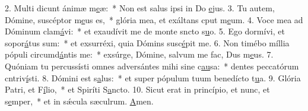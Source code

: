2. Multi dicunt ánimæ m\uline{e}æ:~* Non est salus ipsi in Do \uline{e}jus.
3. Tu autem, Dómine, suscéptor m\uline{e}us es,~* glória mea, et exáltans cput m\uline{e}um.
4. Voce mea ad Dóminum clam\uline{á}vi:~* et exaudívit me de monte sncto s\uline{u}o.
5. Ego dormívi, et sopor\uline{á}tus sum:~* et exsurréxi, quia Dómins susc\uline{é}pit me.
6. Non timébo míllia pópuli circumd\uline{á}ntis me:~* exsúrge, Dómine, salvum me fac, Dus m\uline{e}us.
7. Quóniam tu percussísti omnes adversántes mihi sine c\uline{au}sa:~* dentes peccatórum cntriv\uline{í}sti.
8. Dómini est s\uline{a}lus:~* et super pópulum tuum benedícto t\uline{u}a.
9. Glória Patri, et F\uline{í}lio,~* et Spiríti S\uline{a}ncto.
10. Sicut erat in princípio, et nunc, et s\uline{e}mper,~* et in sǽcula sæculrum. \uline{A}men.
